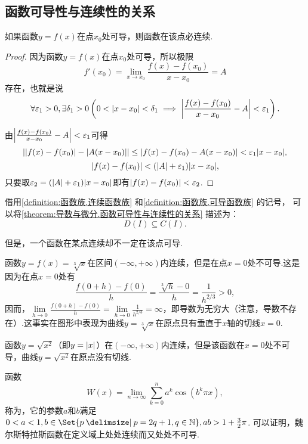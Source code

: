 \subsection{函数可导性与连续性的关系}
\begin{theorem}\label{theorem:导数与微分.函数可导性与连续性的关系}
如果函数\(y = f(x)\)在点\(x_0\)处可导，则函数在该点必连续.
\begin{proof}
因为函数\(y = f(x)\)在点\(x_0\)处可导，所以极限\[
f'(x_0) = \lim\limits_{x \to x_0}\frac{f(x)-f(x_0)}{x-x_0} = A
\]存在，也就是说\[
\forall \varepsilon_1 > 0, \exists \delta_1 > 0 \left(
	0 < \abs{x-x_0} < \delta_1 \implies \abs{\frac{f(x)-f(x_0)}{x-x_0} - A} < \varepsilon_1
\right).
\]

由\(\abs{\frac{f(x)-f(x_0)}{x-x_0} - A} < \varepsilon_1\)可得\[
\abs{\abs{f(x)-f(x_0)} - \abs{A(x-x_0)}}
\leq \abs{f(x)-f(x_0) - A(x-x_0)}
< \varepsilon_1 \abs{x-x_0},
\]\[
\abs{f(x)-f(x_0)} < (\abs{A} + \varepsilon_1) \abs{x-x_0},
\]只要取\(\varepsilon_2 = (\abs{A} + \varepsilon_1) \abs{x-x_0}\)即有\(\abs{f(x)-f(x_0)} < \varepsilon_2\).
\end{proof}
\end{theorem}
借用\cref{definition:函数族.连续函数族} 和\cref{definition:函数族.可导函数族} 的记号，
可以将\cref{theorem:导数与微分.函数可导性与连续性的关系} 描述为：\[
D(I) \subseteq C(I).
\]

但是，一个函数在某点连续却不一定在该点可导.
\begin{example}
函数\(y=f(x)=\sqrt[3]x\)在区间\((-\infty,+\infty)\)内连续，但是在点\(x=0\)处不可导.这是因为在点\(x=0\)处有\[
\frac{f(0+h)-f(0)}{h}
=\frac{\sqrt[3]{h}-0}{h}
=\frac{1}{h^{2/3}}>0,
\]因而，\(\lim\limits_{h\to0}\frac{f(0+h)-f(0)}{h}=\lim\limits_{h\to0}\frac{1}{h^{2/3}}=\infty\)，即导数为无穷大（注意，导数不存在）.这事实在图形中表现为曲线\(y=\sqrt[3]x\)在原点具有垂直于\(x\)轴的切线\(x=0\).
\end{example}

\begin{example}
函数\(y=\sqrt{x^2}\)（即\(y=\abs{x}\)）在\((-\infty,+\infty)\)内连续，但是该函数在\(x=0\)处不可导，曲线\(y=\sqrt{x^2}\)在原点没有切线.
\end{example}

\begin{example}
函数\[
W(x) = \lim\limits_{n\to\infty} \sum\limits_{k=0}^n a^k \cos(b^k \pi x),
\]称为，它的参数\(a\)和\(b\)满足\(0<a<1, b\in\Set{ p \given p = 2q+1, q\in\mathbb{N} }, ab > 1+\frac{3}{2}\pi\).
可以证明，魏尔斯特拉斯函数在定义域上处处连续而又处处不可导.
\end{example}

